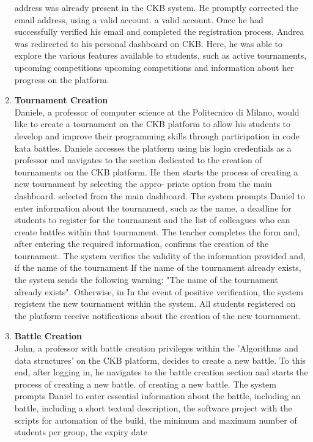\begin{enumerate}[label=\textbf{\Alph*}.]
address was already present in the CKB system. He promptly corrected the email address, using a valid account.
a valid account. Once he had successfully verified his email and completed the
registration process, Andrea was redirected to his personal dashboard on CKB. Here, he was able to
explore the various features available to students, such as active tournaments, upcoming competitions
upcoming competitions and information about her progress on the platform.
    \item \textbf{Tournament Creation} \\ 
    Daniele, a professor of computer science at the Politecnico di Milano, would like to create a tournament on the
CKB platform to allow his students to develop and improve their
programming skills through participation in code kata battles.
Daniele accesses the platform using his login credentials as a professor and navigates
to the section dedicated to the creation of tournaments on the CKB platform.
He then starts the process of creating a new tournament by selecting the appro- priate option from the main dashboard.
selected from the main dashboard. The system prompts Daniel to enter information about the tournament,
such as the name, a deadline for students to register for the tournament and the list
of colleagues who can create battles within that tournament.
The teacher completes the form and, after entering the required information, confirms the creation
of the tournament. The system verifies the validity of the information provided and, if the name of the tournament
If the name of the tournament already exists, the system sends the following warning: "The name of the tournament already exists". Otherwise, in
In the event of positive verification, the system registers the new tournament within the system. All students
registered on the platform receive notifications about the creation of the new tournament.
\item \textbf{Battle Creation} \\ 
John, a professor with battle creation privileges within the 'Algorithms and
data structures' on the CKB platform, decides to create a new battle. To this end, after
logging in, he navigates to the battle creation section and starts the process of creating a new battle.
of creating a new battle. The system prompts Daniel to enter essential information about the battle, including an
battle, including a short textual description, the software project with the scripts for
automation of the build, the minimum and maximum number of students per group, the expiry date

\end{enumerate}
